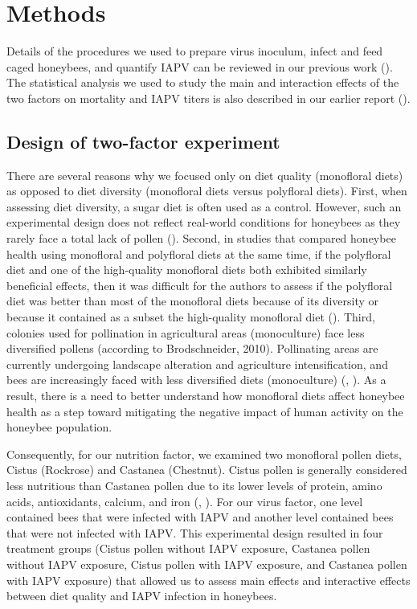 \documentclass[11pt,a4paper,oldfontcommands,openany]{memoir}
\numberwithin{equation}{section} %
\begin{document}
\section{Methods}

Details of the procedures we used to prepare virus inoculum, infect and feed caged honeybees, and quantify IAPV can be reviewed in our previous work (\citealt{adamInt}). The statistical analysis we used to study the main and interaction effects of the two factors on mortality and IAPV titers is also described in our earlier report (\citealt{adamInt}).

\subsection{Design of two-factor experiment}

There are several reasons why we focused only on diet quality (monofloral diets) as opposed to diet diversity (monofloral diets versus polyfloral diets). First, when assessing diet diversity, a sugar diet is often used as a control. However, such an experimental design does not reflect real-world conditions for honeybees as they rarely face a total lack of pollen (\citealt{DiPasquale}). Second, in studies that compared honeybee health using monofloral and polyfloral diets at the same time, if the polyfloral diet and one of the high-quality monofloral diets both exhibited similarly beneficial effects, then it was difficult for the authors to assess if the polyfloral diet was better than most of the monofloral diets because of its diversity or because it contained as a subset the high-quality monofloral diet (\citealt{DiPasquale}). Third, colonies used for pollination in agricultural areas (monoculture) face less diversified pollens (according to Brodschneider, 2010). Pollinating areas are currently undergoing landscape alteration and agriculture intensification, and bees are increasingly faced with less diversified diets (monoculture) (\citealt{landscape1}, \citealt{brodschneider}). As a result, there is a need to better understand how monofloral diets affect honeybee health as a step toward mitigating the negative impact of human activity on the honeybee population.

Consequently, for our nutrition factor, we examined two monofloral pollen diets, Cistus (Rockrose) and Castanea (Chestnut). Cistus pollen is generally considered less nutritious than Castanea pollen due to its lower levels of protein, amino acids, antioxidants, calcium, and iron (\citealt{DiPasquale}, \citealt{adamInt}). For our virus factor, one level contained bees that were infected with IAPV and another level contained bees that were not infected with IAPV. This experimental design resulted in four treatment groups (Cistus pollen without IAPV exposure, Castanea pollen without IAPV exposure, Cistus pollen with IAPV exposure, and Castanea pollen with IAPV exposure) that allowed us to assess main effects and interactive effects between diet quality and IAPV infection in honeybees.
\end{document}
